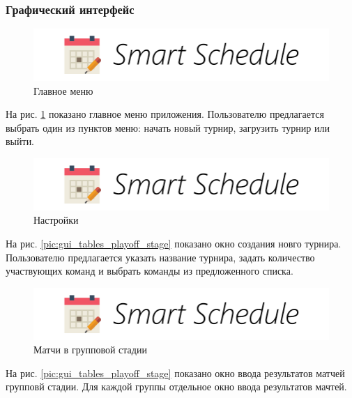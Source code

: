 \subsubsection{Графический интерфейс}

\begin{figure}[H]
	\begin{center}
		\includegraphics[scale=0.52]{pics/logo}
		\caption{Главное меню} 
		\label{pic:gui_main_menu} %
	\end{center}
\end{figure}
На рис. \ref{pic:gui_main_menu} показано главное меню приложения. Пользователю предлагается выбрать один из пунктов меню: начать новый турнир, загрузить турнир или выйти.

\begin{figure}[H]
	\begin{center}
		\includegraphics[scale=0.52]{pics/logo}
		\caption{Настройки} 
		\label{pic:gui_settings} %
	\end{center}
\end{figure}
На рис. \ref{pic:gui_tables_playoff_stage} показано окно создания новго турнира. Пользователю предлагается указать название турнира, задать количество участвующих команд и выбрать команды из предложенного списка.

\begin{figure}[H]
	\begin{center}
		\includegraphics[scale=0.52]{pics/logo}
		\caption{Матчи в групповой стадии} 
		\label{pic:gui_matches_group_stage} %
	\end{center}
\end{figure}
На рис. \ref{pic:gui_tables_playoff_stage} показано окно ввода результатов матчей групповй стадии. Для каждой группы отдельное окно ввода результатов мачтей.

